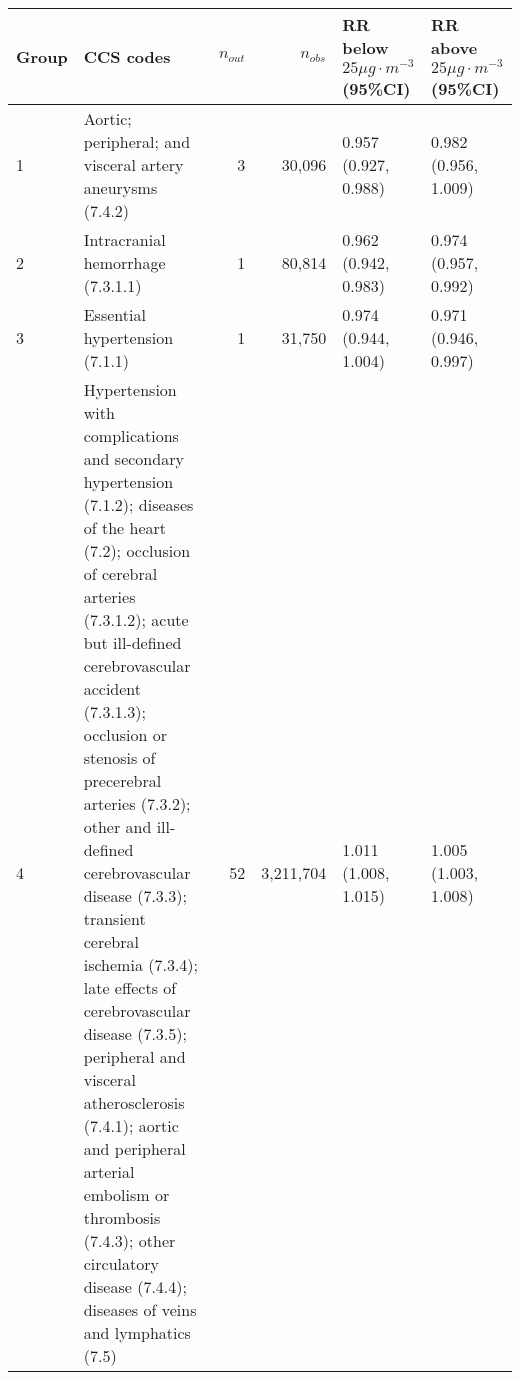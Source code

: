 \begin{tabular}{lp{6.5cm}rrp{2.2cm}p{2.2cm}}
  \hline
Group & CCS codes & $n_{out}$ & $n_{obs}$ & RR below $25 \mu g \cdot m^{-3}$ (95\%CI) & RR above $25 \mu g \cdot m^{-3}$ (95\%CI) \\ 
  \hline
   1 & Aortic; peripheral; and visceral artery aneurysms (7.4.2) &    3 & 30,096 & 0.957 (0.927, 0.988) & 0.982 (0.956, 1.009) \\ 
     2 & Intracranial hemorrhage (7.3.1.1) &    1 & 80,814 & 0.962 (0.942, 0.983) & 0.974 (0.957, 0.992) \\ 
     3 & Essential hypertension (7.1.1) &    1 & 31,750 & 0.974 (0.944, 1.004) & 0.971 (0.946, 0.997) \\ 
     4 & Hypertension with complications and secondary hypertension (7.1.2); diseases of the heart (7.2); occlusion of cerebral arteries (7.3.1.2); acute but ill-defined cerebrovascular accident (7.3.1.3); occlusion or stenosis of precerebral arteries (7.3.2); other and ill-defined cerebrovascular disease (7.3.3); transient cerebral ischemia (7.3.4); late effects of cerebrovascular disease (7.3.5); peripheral and visceral atherosclerosis (7.4.1); aortic and peripheral arterial embolism or thrombosis (7.4.3); other circulatory disease (7.4.4); diseases of veins and lymphatics (7.5) &   52 & 3,211,704 & 1.011 (1.008, 1.015) & 1.005 (1.003, 1.008) \\ 
   \hline
\end{tabular}

